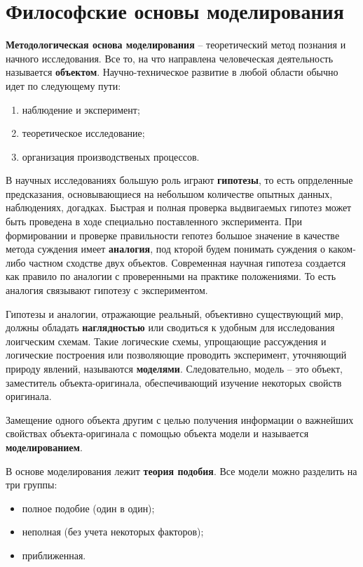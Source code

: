 \section{Философские основы моделирования}

\textbf{Методологическая основа моделирования} -- теоретический метод познания и начного исследования. Все то, на что направлена человеческая деятельность называется \textbf{объектом}. Научно-техническое развитие в любой области обычно идет по следующему пути:

\begin{enumerate}
    \item наблюдение и эксперимент;
    \item теоретическое исследование;
    \item организация производственых процессов.
\end{enumerate}

В научных исследованиях большую роль играют \textbf{гипотезы}, то есть опрделенные предсказания, основывающиеся на небольшом количестве опытных данных, наблюдениях, догадках. Быстрая и полная проверка выдвигаемых гипотез может быть проведена в ходе специально поставленного эксперимента. При формировании и проверке правильности гепотез большое значение в качестве метода суждения имеет \textbf{аналогия}, под кторой будем понимать суждения о каком-либо частном сходстве двух объектов. Современная научная гипотеза создается как правило по аналогии с проверенными на практике положениями. То есть аналогия связывают гипотезу с экспериментом.

Гипотезы и аналогии, отражающие реальный, объективно существующий мир, должны обладать \textbf{наглядностью} или сводиться к удобным для исследования лоигческим схемам. Такие логические схемы, упрощающие рассуждения и логические построения или позволяющие проводить эксперимент, уточняющий природу явлений, называются \textbf{моделями}. Следовательно, модель -- это объект, заместитель объекта-оригинала, обеспечивающий изучение некоторых свойств оригинала.

Замещение одного объекта другим с целью получения информации о важнейших свойствах объекта-оригинала с помощью объекта модели и называется \textbf{моделированием}.

В основе моделирования лежит \textbf{теория подобия}. Все модели можно разделить на три группы:

\begin{itemize}
    \item полное подобие (один в один);
    \item неполная (без учета некоторых факторов);
    \item приближенная.
\end{itemize}
